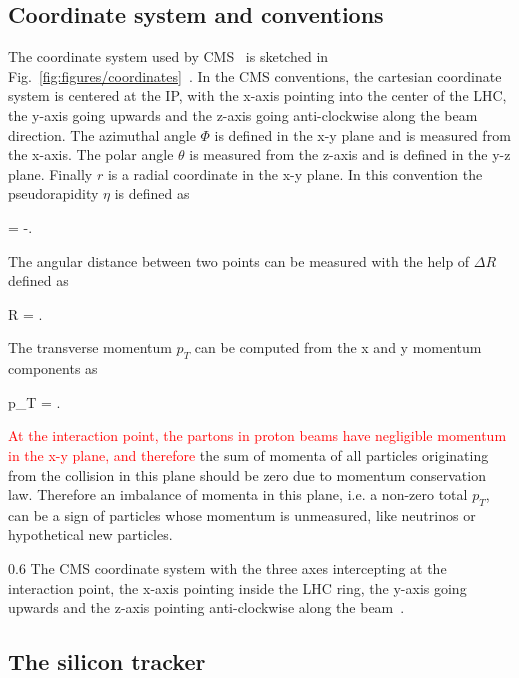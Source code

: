 \subsection{Coordinate system and conventions}


The coordinate system used by CMS~\cite{Chatrchyan:2008zzk} is sketched in Fig.~\ref{fig:figures/coordinates}~\cite{Pantaleo:2293435}. In the CMS conventions, the cartesian coordinate system is centered at the IP, with the x-axis pointing into the center of the LHC, the y-axis going upwards and the z-axis going anti-clockwise along the beam direction. The azimuthal angle $\Phi$ is defined in the x-y plane and is measured from the x-axis. The polar angle $\theta$ is measured from the z-axis and is defined in the y-z plane. Finally $r$ is a radial coordinate in the x-y plane. In this convention the pseudorapidity $\eta$ is defined as

{
    \eta =  -\ln {}.
}

The angular distance between two points can be measured with the help of $\Delta R$ defined as

{
    \Delta R = .
}


The transverse momentum $p_{T}$ can be computed from the x and y momentum components as

{
    p_{T} =  .
}

\textcolor{red}{At the interaction point, the partons in proton beams have negligible momentum in the x-y plane, and therefore  } the sum of momenta of all particles originating from the collision in this plane should be zero due to momentum conservation law. Therefore an imbalance of momenta in this plane, i.e. a non-zero total $p_{T}$, can be a sign of particles whose momentum is unmeasured, like neutrinos or hypothetical new particles. 

                 {0.6}       %
                 { The CMS coordinate system with the three axes intercepting at the interaction point, the x-axis pointing inside the LHC ring, the y-axis going upwards and the z-axis pointing anti-clockwise along the beam~\cite{Pantaleo:2293435}. }

\subsection{The silicon tracker~\label{sec:tracker}}

